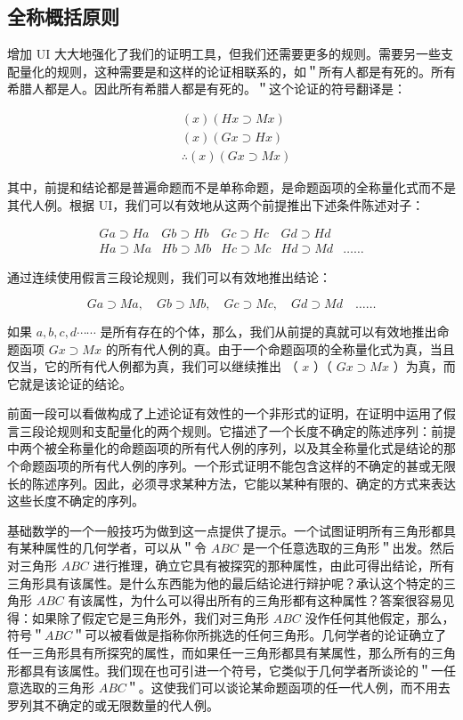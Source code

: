 \subsection{全称概括原则}

增加 UI 大大地强化了我们的证明工具，但我们还需要更多的规则。需要另一些支配量化的规则，这种需要是和这样的论证相联系的，如＂所有人都是有死的。所有希腊人都是人。因此所有希腊人都是有死的。＂这个论证的符号翻译是：

$$
\begin{aligned}
& (x)(H x \supset M x) \\
& (x)(G x \supset H x) \\
& \therefore(x)(G x \supset M x)
\end{aligned}
$$

其中，前提和结论都是普遍命题而不是单称命题，是命题函项的全称量化式而不是其代人例。根据 UI，我们可以有效地从这两个前提推出下述条件陈述对子：

$$
\begin{array}{lllll}
G a \supset H a & G b \supset H b & G c \supset H c & G d \supset H d & \\
H a \supset M a & H b \supset M b & H c \supset M c & H d \supset M d & \ldots \ldots
\end{array}
$$

通过连续使用假言三段论规则，我们可以有效地推出结论：

$$
G a \supset M a, \quad G b \supset M b, \quad G c \supset M c, \quad G d \supset M d \quad \ldots \ldots
$$

如果 $a, b, c, d \cdots \cdots$ 是所有存在的个体，那么，我们从前提的真就可以有效地推出命题函项 $G x \supset M x$ 的所有代人例的真。由于一个命题函项的全称量化式为真，当且仅当，它的所有代人例都为真，我们可以继续推出 （ $x$ ）（ $G x \supset M x$ ）为真，而它就是该论证的结论。

前面一段可以看做构成了上述论证有效性的一个非形式的证明，在证明中运用了假言三段论规则和支配量化的两个规则。它描述了一个长度不确定的陈述序列：前提中两个被全称量化的命题函项的所有代人例的序列，以及其全称量化式是结论的那个命题函项的所有代人例的序列。一个形式证明不能包含这样的不确定的甚或无限长的陈述序列。因此，必须寻求某种方法，它能以某种有限的、确定的方式来表达这些长度不确定的序列。

基础数学的一个一般技巧为做到这一点提供了提示。一个试图证明所有三角形都具有某种属性的几何学者，可以从＂令 $A B C$ 是一个任意选取的三角形＂出发。然后对三角形 $A B C$ 进行推理，确立它具有被探究的那种属性，由此可得出结论，所有三角形具有该属性。是什么东西能为他的最后结论进行辩护呢？承认这个特定的三角形 $A B C$ 有该属性，为什么可以得出所有的三角形都有这种属性？答案很容易见得：如果除了假定它是三角形外，我们对三角形 $A B C$ 没作任何其他假定，那么，符号＂$A B C$＂可以被看做是指称你所挑选的任何三角形。几何学者的论证确立了任一三角形具有所探究的属性，而如果任一三角形都具有某属性，那么所有的三角形都具有该属性。我们现在也可引进一个符号，它类似于几何学者所谈论的＂一任意选取的三角形 $A B C$＂。这使我们可以谈论某命题函项的任一代人例，而不用去罗列其不确定的或无限数量的代人例。

